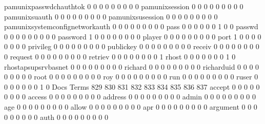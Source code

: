 \documentclass[compress,8pt]{beamer}
\begin{document}
\begin{frame}
\begin{Schunk}
  pamunixpasswdchauthtok                     0   0   0   0   0   0   0   0   0
  pamunixsession                             0   0   0   0   0   0   0   0   0
  pamunixsuauth                              0   0   0   0   0   0   0   0   0
  pamunixsusession                           0   0   0   0   0   0   0   0   0
  pamunixsystemconfignetworkauth             0   0   0   0   0   0   0   0   0
  pass                                       0   0   0   0   0   0   1   0   0
  passwd                                     0   0   0   0   0   0   0   0   0
  password                                   1   0   0   0   0   0   0   0   0
  player                                     0   0   0   0   0   0   0   0   0
  port                                       1   0   0   0   0   0   0   0   0
  privileg                                   0   0   0   0   0   0   0   0   0
  publickey                                  0   0   0   0   0   0   0   0   0
  receiv                                     0   0   0   0   0   0   0   0   0
  request                                    0   0   0   0   0   0   0   0   0
  retriev                                    0   0   0   0   0   0   0   0   1
  rhost                                      0   0   0   0   0   0   0   1   0
  rhostapsupsrvbasnet                        0   0   0   0   0   0   0   0   0
  richard                                    0   0   0   0   0   0   0   0   0
  richarduid                                 0   0   0   0   0   0   0   0   0
  root                                       0   0   0   0   0   0   0   0   0
  roy                                        0   0   0   0   0   0   0   0   0
  run                                        0   0   0   0   0   0   0   0   0
  ruser                                      0   0   0   0   0   0   0   1   0
                                          Docs
Terms                                      829 830 831 832 833 834 835 836 837
  accept                                     0   0   0   0   0   0   0   0   0
  access                                     0   0   0   0   0   0   0   0   0
  address                                    0   0   0   0   0   0   0   0   0
  admin                                      0   0   0   0   0   0   0   0   0
  age                                        0   0   0   0   0   0   0   0   0
  allow                                      0   0   0   0   0   0   0   0   0
  apr                                        0   0   0   0   0   0   0   0   0
  argument                                   0   0   0   0   0   0   0   0   0
  auth                                       0   0   0   0   0   0   0   0   0

\end{Schunk}
\end{frame}
\end{document}
